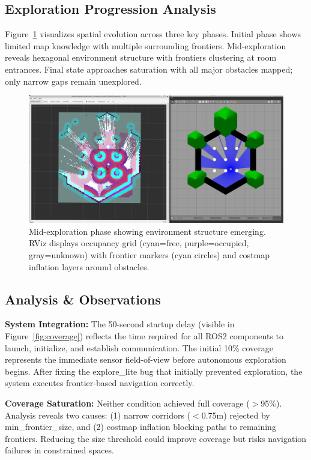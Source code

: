 \documentclass[conference]{IEEEtran}
\begin{document}
\subsection{Exploration Progression Analysis}

Figure~\ref{fig:progression} visualizes spatial evolution across three key phases. Initial phase shows limited map knowledge with multiple surrounding frontiers. Mid-exploration reveals hexagonal environment structure with frontiers clustering at room entrances. Final state approaches saturation with all major obstacles mapped; only narrow gaps remain unexplored.

\begin{figure}[h]
\centering
\includegraphics[width=\columnwidth]{figures/Progress_3of6.png}
\caption{Mid-exploration phase showing environment structure emerging. RViz displays occupancy grid (cyan=free, purple=occupied, gray=unknown) with frontier markers (cyan circles) and costmap inflation layers around obstacles.}
\label{fig:progression}
\end{figure}

\subsection{Analysis \& Observations}

\textbf{System Integration:} The 50-second startup delay (visible in Figure~\ref{fig:coverage}) reflects the time required for all ROS2 components to launch, initialize, and establish communication. The initial 10\% coverage represents the immediate sensor field-of-view before autonomous exploration begins. After fixing the explore\_lite bug that initially prevented exploration, the system executes frontier-based navigation correctly.

\textbf{Coverage Saturation:} Neither condition achieved full coverage ($>$95\%). Analysis reveals two causes: (1) narrow corridors ($<$0.75m) rejected by min\_frontier\_size, and (2) costmap inflation blocking paths to remaining frontiers. Reducing the size threshold could improve coverage but risks navigation failures in constrained spaces.
\end{document}

